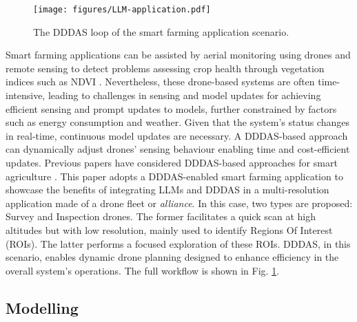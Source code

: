 \documentclass[runningheads]{llncs}
\begin{document}
\begin{figure}
\centering
\vspace{-.3cm}
\texttt{[image: figures/LLM-application.pdf]}
\caption{The DDDAS loop of the smart farming application scenario.} \label{llm-app}
\vspace{-.5cm}
\end{figure}


Smart farming applications can be assisted by aerial monitoring using drones and remote sensing to detect problems assessing crop health through vegetation indices such as NDVI \cite{zhang2014crop}. Nevertheless, these drone-based systems are often time-intensive, leading to challenges in sensing and model updates for achieving efficient sensing and prompt updates to models, further constrained by factors such as energy consumption and weather. Given that the system's status changes in real-time, continuous model updates are necessary. A DDDAS-based approach can dynamically adjust drones' sensing behaviour %
enabling time and cost-efficient updates. Previous papers have considered DDDAS-based approaches for smart agriculture \cite{9361651,8642114,9004854,10.1007/978-981-15-1078-6_1}. This paper adopts a DDDAS-enabled smart farming application to showcase the benefits of integrating LLMs and DDDAS in a multi-resolution application made of a drone fleet or \textit{alliance}. In this case, two types are proposed: Survey and Inspection drones. The former facilitates a quick scan at high altitudes but with low resolution, mainly used to identify Regions Of Interest (ROIs). The latter performs a focused exploration of these ROIs. DDDAS, in this scenario, enables dynamic drone planning designed to enhance efficiency in the overall system's operations.
The full workflow is shown in Fig. \ref{llm-app}.


\vspace{-.2cm}
\subsection{Modelling}

\end{document}
